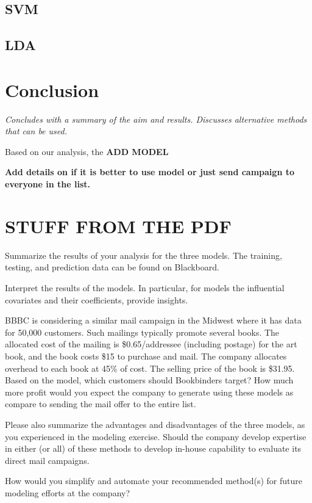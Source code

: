 \documentclass[
]{article}
\begin{document}
\hypertarget{svm-1}{%
\subsection{SVM}\label{svm-1}}

\hypertarget{lda-1}{%
\subsection{LDA}\label{lda-1}}

\hypertarget{conclusion}{%
\section{Conclusion}\label{conclusion}}

\emph{Concludes with a summary of the aim and results. Discusses
alternative methods that can be used.}

Based on our analysis, the \textbf{ADD MODEL}

\textbf{Add details on if it is better to use model or just send
campaign to everyone in the list.}

\hypertarget{stuff-from-the-pdf}{%
\section{STUFF FROM THE PDF}\label{stuff-from-the-pdf}}

Summarize the results of your analysis for the three models. The
training, testing, and prediction data can be found on Blackboard.

Interpret the results of the models. In particular, for models the
influential covariates and their coefficients, provide insights.

BBBC is considering a similar mail campaign in the Midwest where it has
data for 50,000 customers. Such mailings typically promote several
books. The allocated cost of the mailing is \$0.65/addressee (including
postage) for the art book, and the book costs \$15 to purchase and mail.
The company allocates overhead to each book at 45\% of cost. The selling
price of the book is \$31.95. Based on the model, which customers should
Bookbinders target? How much more profit would you expect the company to
generate using these models as compare to sending the mail offer to the
entire list.

Please also summarize the advantages and disadvantages of the three
models, as you experienced in the modeling exercise. Should the company
develop expertise in either (or all) of these methods to develop
in-house capability to evaluate its direct mail campaigns.

How would you simplify and automate your recommended method(s) for
future modeling efforts at the company?
\end{document}
